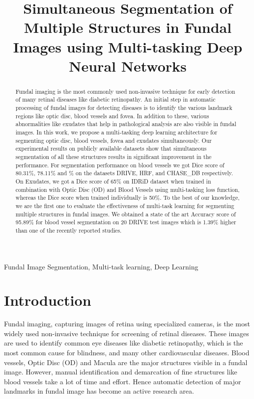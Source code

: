 \documentclass{article}
\title{Simultaneous Segmentation of Multiple Structures in Fundal Images using Multi-tasking Deep Neural Networks}
\begin{document}
%
\maketitle
%
\begin{abstract}
Fundal imaging is the most commonly used non-invasive technique for early detection of many retinal diseases like diabetic retinopathy. An initial step in automatic processing of fundal images for detecting diseases is to identify the various landmark regions like optic disc, blood vessels and fovea. In addition to these, various abnormalities like exudates that help in pathological analysis are also visible in fundal images. In this work, we propose a multi-tasking deep learning architecture for segmenting optic disc, blood vessels, fovea and exudates simultaneously. Our experimental results on publicly available datasets show that simultaneous segmentation of all these structures results in significant improvement in the performance. For segmentation performance on blood vessels we got Dice score of 80.31\%, 78.11\% and \% on the datasets DRIVE, HRF, and CHASE\_DB respectively. On Exudates, we got a Dice score of 65\% on IDRiD dataset when trained in combination with Optic Disc (OD) and Blood Vessels using multi-tasking loss function, whereas the Dice score when trained individually is 50\%. To the best of our knowledge, we  are the first one to evaluate the effectiveness of  multi-task learning for segmenting multiple structures in fundal images. We obtained a state of the art Accuracy score of 95.89\% for blood vessel segmentation on 20 DRIVE test images which is 1.39\% higher than one of the recently reported studies.
\end{abstract}
%
\begin{keywords}
Fundal Image Segmentation, Multi-task learning, Deep Learning
\end{keywords}
%

\section{Introduction}
Fundal imaging, capturing images of retina using specialized cameras, is the most widely used non-invasive technique for screening of retinal diseases.
These images are used to identify common eye diseases like diabetic retinopathy, which is the most common cause for blindness, and many other cardiovascular diseases. Blood vessels, Optic Disc (OD) and Macula are the major structures visible in a fundal image. However, manual identification and demarcation of fine structures like blood vessels take a lot of time and effort. Hence automatic detection of major landmarks in fundal image has become an active research area.
\end{document}
